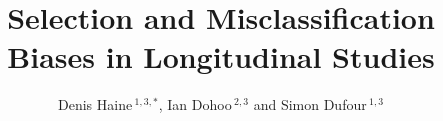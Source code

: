 \documentclass[utf8]{frontiersSCNS}\usepackage[]{graphicx}\usepackage[]{color}
\def\firstAuthorLast{Haine {et~al.}} %
\def\Authors{Denis Haine\,$^{1,3,*}$, Ian Dohoo\,$^{2,3}$ and Simon Dufour\,$^{1,3}$}
\begin{document}
\onecolumn
{}

\title[Bias in Cohort Studies]{Selection and Misclassification Biases in
  Longitudinal Studies} 

\author[\firstAuthorLast ]{\Authors} %
\address{} %
\correspondance{} %

\extraAuth{}%


\maketitle
\end{document}

